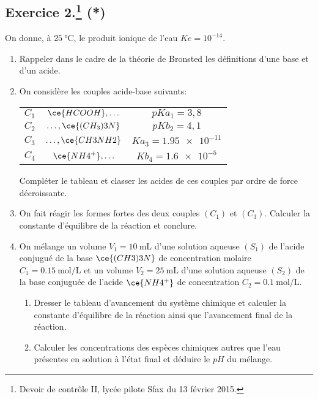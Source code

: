 \documentclass[a4paper]{article}
\begin{document}
\subsection*{Exercice 2.\footnote{Devoir de contrôle II, lycée pilote Sfax du 13 février 2015.} (*)}
On donne, à $\SI{25}{\celsius}$, le produit ionique de l'eau $Ke=10^{-14}$.
 \begin{enumerate}
	 \item Rappeler dans le cadre de la théorie de Bronsted les définitions d'une base et d'un acide.
	 \item On considère les couples acide-base suivants:
		 \begin{table}[h!]
		\centering
		 \begin{tabular}{c|c|c}
			 $C_1$ & $\ce{HCOOH},\ldots$ &  $pKa_1=3,8$\\
			 $C_2$ & $\ldots,\ce{(CH_3)3N}$ & $pKb_2=4,1$\\
			 $C_3$ & $\ldots,\ce{CH3NH2}$ & $Ka_3=\num{1,95e-11}$\\
			 $C_4$ & $\ce{NH4^+},\ldots$ & $Kb_4=\num{1,6e-5}$
		 \end{tabular}
	 \end{table}

Compléter le tableau et classer les acides de ces couples par ordre de force décroissante.
\item On fait réagir les formes fortes des deux couples $(C_1)$ et $(C_3)$. Calculer la constante d'équilibre de la réaction et conclure.
\item On mélange un volume $V_1=\SI{10}{\milli\L}$ d'une solution aqueuse $(S_1)$ de l'acide conjugué de la base $\ce{(CH3)3N}$ de concentration molaire $C_1=\SI{0.15}{\mol\per\L}$ et un volume $V_2=\SI{25}{\milli\L}$ d'une solution aqueuse $(S_2)$ de la base conjuguée de l'acide $\ce{NH4^+}$ de concentration $C_2=\SI{0.1}{\mol\per\L}$.
	\begin{enumerate}[label=(\alph*)]
	\item Dresser le tableau d'avancement du système chimique et calculer la constante d'équilibre de la réaction ainsi que l'avancement final de la réaction.
	\item Calculer les concentrations des espèces chimiques autres que l'eau présentes en solution à l'état final et déduire le $pH$ du mélange.
\end{enumerate}
\end{enumerate}
\end{document}

